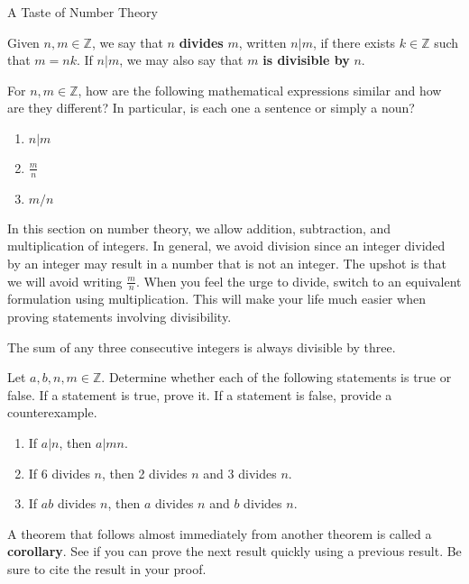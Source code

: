 \begin{section}{A Taste of Number Theory}
\begin{definition}\label{def:divides}
Given $n,m\in\mathbb{Z}$, we say that $n$ \textbf{divides} $m$, written $\boxed{n|m}$, if there exists $k\in\mathbb{Z}$ such that $m=nk$. If $n|m$, we may also say that $m$ \textbf{is divisible by} $n$.
\end{definition}

\begin{problem}
For $n,m\in\mathbb{Z}$, how are the following mathematical expressions similar and how are they different? In particular, is each one a sentence or simply a noun?
\begin{enumerate}[label=\textrm{(\alph*)}]
\item $n|m$
\item $\displaystyle \frac{m}{n}$
\item $m/n$
\end{enumerate}
\end{problem}

In this section on number theory, we allow addition, subtraction, and multiplication of integers.  In general, we avoid division since an integer divided by an integer may result in a number that is not an integer. The upshot is that we will avoid writing $\frac{m}{n}$.  When you feel the urge to divide, switch to an equivalent formulation using multiplication. This will make your life much easier when proving statements involving divisibility.

\begin{theorem}\label{thm:sum of three consecutive integers}
The sum of any three consecutive integers is always divisible by three.
\end{theorem}

\begin{problem}\label{prob:divisibility examples}
Let $a, b,n, m\in\mathbb{Z}$. Determine whether each of the following statements is true or false.  If a statement is true, prove it. If a statement is false, provide a counterexample.
\begin{enumerate}[label=\textrm{(\alph*)}]
\item\label{prob:first divisibility example} If $a|n$, then $a|mn$.
\item If 6 divides $n$, then 2 divides $n$ and 3 divides $n$.
\item If $ab$ divides $n$, then $a$ divides $n$ and $b$ divides $n$.
\end{enumerate}
\end{problem}

A theorem that follows almost immediately from another theorem is called a \textbf{corollary}.  See if you can prove the next result quickly using a previous result.  Be sure to cite the result in your proof.


\end{section}
